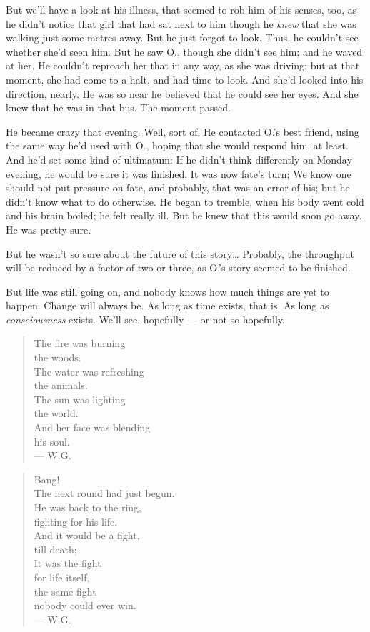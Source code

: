But we'll have a look at his illness, that seemed to rob him of his senses, too, as he didn't notice that girl that had sat next to him though he \emph{knew} that she was walking just some metres away. 
But he just forgot to look. 
Thus, he couldn't see whether she'd seen him. 
But he saw O., though she didn't see him; and he waved at her. 
He couldn't reproach her that in any way, as she was driving; but at that moment, she had come to a halt, and had time to look. 
And she'd looked into his direction, nearly. 
He was so near he believed that he could see her eyes. 
And she knew that he was in that bus. 
The moment passed. 

He became crazy that evening. 
Well, sort of. 
He contacted O.'s best friend, using the same way he'd used with O., hoping that she would respond him, at least. 
And he'd set some kind of ultimatum: If he didn't think differently on Monday evening, he would be sure it was finished. It was now fate's turn; We know one should not put pressure on fate, and probably, that was an error of his; but he didn't know what to do otherwise. 
He began to tremble, when his body went cold and his brain boiled; he felt really ill. 
But he knew that this would soon go away. 
He was pretty sure.

But he wasn't so sure about the future of this story\ldots
Probably, the throughput will be reduced by a factor of two or three, as O.'s story seemed to be finished.

But life was still going on, and nobody knows how much things are yet to happen.
Change will always be. 
As long as time exists, that is. 
As long as \emph{consciousness} exists. 
We'll see, hopefully --- or not so hopefully. 

\begin{verse}
The fire was burning \\
the woods. \\
The water was refreshing \\
the animals. \\
The sun was lighting \\
the world. \\
And her face was blending \\
his soul. \\
--- W.G.
\end{verse}

\begin{verse}
Bang!\\
The next round had just begun. \\
He was back to the ring, \\
fighting for his life. \\
And it would be a fight, \\
till death; \\
It was the fight \\
for life itself, \\
the same fight \\
nobody could ever win. \\
--- W.G.
\end{verse}

